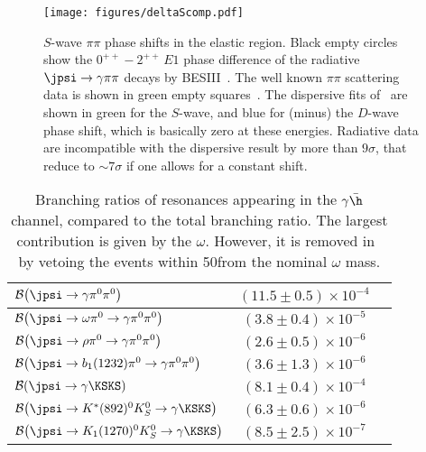 \begin{figure}[t]
{\centering
\texttt{[image: figures/deltaScomp.pdf]} 
}
\caption{$S$-wave $\pi\pi$ phase shifts in the elastic region. Black empty circles show the $0^{++} - 2^{++}\,E1$  
phase difference of the radiative $\jpsi\to\gamma\pi\pi$ decays by BESIII~\cite{Ablikim:2015umt}. The well known $\pi \pi$ scattering data is shown in green empty squares~\cite{Hyams:1973zf,Grayer:1974cr,Hyams:1975mc,Cohen:1980cq,Kaminski:1996da,Batley:2010zza}. The dispersive fits of~\cite{GarciaMartin:2011cn,Pelaez:2019eqa} are shown in green for the $S$-wave, and blue for (minus) the $D$-wave phase shift, which is basically zero at these energies. Radiative data are incompatible with the dispersive result by more than $9\sigma$, that reduce to $\sim 7\sigma$ if one allows for a constant shift.}
\label{fig:upto1GeV}
\end{figure}
 
\begin{table}[b]
\caption{Branching ratios of resonances appearing in the $\gamma \bar\h$ channel, compared to the total branching ratio. The largest contribution is given by the $\omega$. However, it is removed in~\cite{Ablikim:2015umt} by vetoing the events within 50\mev from the nominal $\omega$ mass.
}
\begin{tabular}{l | c c}
\hline\hline
$\mathcal{B}\!\left(\jpsi \to \gamma \pi^0\pi^0\right)$ & $(11.5 \pm 0.5) \times 10^{-4}$ &\cite{Ablikim:2015umt}\\\hline
$\mathcal{B}\!\left(\jpsi \to \omega\pi^0 \to \gamma \pi^0\pi^0\right)$ & $(3.8 \pm 0.4) \times 10^{-5}$ &\multirow{3}{*}{\cite{pdg}}\\
$\mathcal{B}\!\left(\jpsi \to \rho\pi^0 \to \gamma \pi^0\pi^0\right)$ & $(2.6 \pm 0.5) \times 10^{-6}$ &\\
$\mathcal{B}\!\left(\jpsi \to b_1(1232)\pi^0 \to \gamma \pi^0\pi^0\right)$ & $(3.6 \pm 1.3) \times 10^{-6}$ & \\\hline\hline
$\mathcal{B}\!\left(\jpsi \to \gamma \KSKS\right)$ & $(8.1 \pm 0.4) \times 10^{-4}$ &\cite{Ablikim:2018izx}\\\hline
$\mathcal{B}\!\left(\jpsi \to K^{*}(892)^0 K_S^0 \to \gamma \KSKS\right)$ & $(6.3 \pm 0.6) \times 10^{-6}$ &\multirow{2}{*}{\cite{Ablikim:2018izx}} \\
$\mathcal{B}\!\left(\jpsi \to K_1(1270)^0 K_S^0 \to \gamma \KSKS\right)$ & $(8.5 \pm 2.5) \times 10^{-7}$& \\\hline\hline
\end{tabular}
\label{tab:tchannel}
\end{table}

